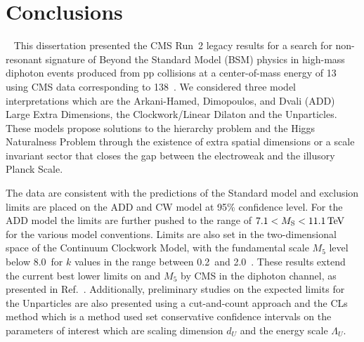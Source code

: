 \chapter{Conclusions}~\label{ch:conclusion}
This dissertation presented the CMS Run~2 legacy results for a search for non-resonant signature of Beyond the Standard Model (BSM) physics in high-mass diphoton events produced from pp collisions at a center-of-mass energy of 13 \TeV using CMS data corresponding to 138~\fbinv. We considered three model interpretations which are the Arkani-Hamed, Dimopoulos, and Dvali (ADD) Large Extra Dimensions, the Clockwork/Linear Dilaton and the Unparticles. These models propose solutions to the hierarchy problem and the Higgs Naturalness Problem through the existence of extra spatial dimensions or a scale invariant sector that closes the gap between the electroweak and the illusory Planck Scale.

The data are consistent with the predictions of the Standard model and exclusion limits are placed on the ADD and CW model at 95\% confidence level. For the ADD model the limits are further pushed to the range of $7.1 < M_{\rm S} < 11.1\,\text{Te\hspace{-.08em}V}$ for the various model conventions. Limits are also set in the two-dimensional space of the Continuum Clockwork Model, with the fundamental scale $M_5$ level below 8.0~\TeV for $k$ values in the range between 0.2~\GeV and 2.0~\TeV. These results extend the current best lower limits on \Ms and $M_5$ by CMS in the diphoton channel, as presented in Ref.~\cite{cmsdiphoton2016}. Additionally, preliminary studies on the expected limits for the Unparticles are also presented using a cut-and-count approach and the CLs method which is a method used set conservative confidence intervals on the parameters of interest which are scaling dimension $d_U$ and the energy scale $\Lambda_{U}$. 

